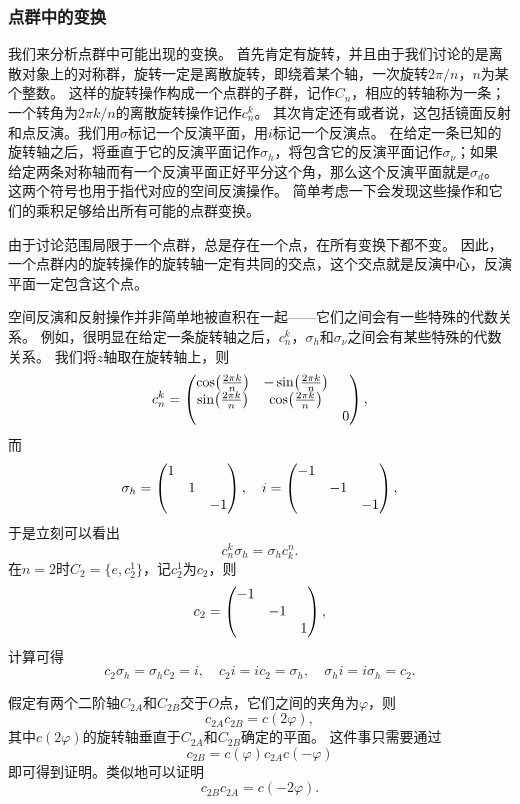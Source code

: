 \subsubsection{点群中的变换}

我们来分析点群中可能出现的变换。
首先肯定有旋转，并且由于我们讨论的是离散对象上的对称群，旋转一定是离散旋转，即绕着某个轴，一次旋转$2\pi / n$，$n$为某个整数。
这样的旋转操作构成一个点群的子群，记作$C_{n}$，相应的转轴称为一条；一个转角为$2\pi k / n$的离散旋转操作记作$c_n^k$。
其次肯定还有或者说，这包括镜面反射和点反演。我们用$\sigma$标记一个反演平面，用$i$标记一个反演点。
在给定一条已知的旋转轴之后，将垂直于它的反演平面记作$\sigma_h$，将包含它的反演平面记作$\sigma_\nu$；如果给定两条对称轴而有一个反演平面正好平分这个角，那么这个反演平面就是$\sigma_d$。
这两个符号也用于指代对应的空间反演操作。
简单考虑一下会发现这些操作和它们的乘积足够给出所有可能的点群变换。

由于讨论范围局限于一个点群，总是存在一个点，在所有变换下都不变。
因此，一个点群内的旋转操作的旋转轴一定有共同的交点，这个交点就是反演中心，反演平面一定包含这个点。

空间反演和反射操作并非简单地被直积在一起——它们之间会有一些特殊的代数关系。
例如，很明显在给定一条旋转轴之后，$c_n^k$，$\sigma_h$和$\sigma_\nu$之间会有某些特殊的代数关系。
我们将$z$轴取在旋转轴上，则
\begin{equation}
    c_n^k = \pmqty{\dmat{ \cos(\frac{2\pi k}{n}) & -\sin(\frac{2\pi k}{n}) \\ \sin(\frac{2\pi k}{n}) & \cos(\frac{2\pi k}{n}), 0 }},
\end{equation}
而
\begin{equation}
    \sigma_h = \pmqty{\dmat{1, 1, -1}}, \quad i = \pmqty{\dmat{-1, -1, -1}},
\end{equation}
于是立刻可以看出
\begin{equation}
    c_n^k \sigma_h = \sigma_h c^n_k.
\end{equation}
在$n=2$时$C_2=\{e, c^1_2\}$，记$c^1_2$为$c_2$，则
\begin{equation}
    c_2 = \pmqty{\dmat{-1, -1, 1}},
\end{equation}
计算可得
\begin{equation}
    c_2 \sigma_h = \sigma_h c_2 = i, \quad c_2 i = i c_2 = \sigma_h, \quad \sigma_h i = i \sigma_h = c_2.
    \label{eq:sigma-c-i}
\end{equation}

假定有两个二阶轴$C_{2A}$和$C_{2B}$交于$O$点，它们之间的夹角为$\varphi$，则
\begin{equation}
    c_{2A} c_{2B} = c(2\varphi),
\end{equation}
其中$c(2\varphi)$的旋转轴垂直于$C_{2A}$和$C_{2B}$确定的平面。
这件事只需要通过
\begin{equation}
    c_{2B} = c(\varphi) c_{2A} c(-\varphi)
    \label{eq:ab-axis-phi-rotation}
\end{equation}
即可得到证明。类似地可以证明
\begin{equation}
    c_{2B} c_{2A} = c(-2\varphi).
    \label{eq:cb-ca-phi-axis}
\end{equation}


